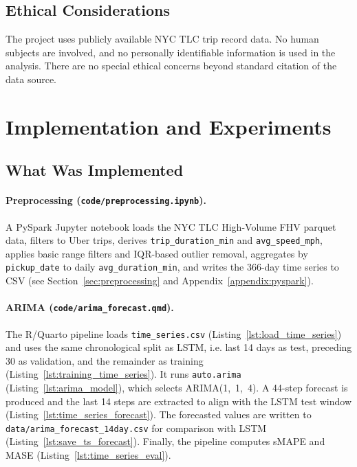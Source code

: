 \documentclass[12pt, a4paper]{article}
\begin{document}
\subsection{Ethical Considerations}

The project uses publicly available NYC TLC trip record data. No human subjects are involved, and no personally identifiable information is used in the analysis. There are no special ethical concerns beyond standard citation of the data source.

\section{Implementation and Experiments}\label{sec:implementation}

\subsection{What Was Implemented}

\paragraph{Preprocessing (\texttt{code/preprocessing.ipynb}).}\mbox{} A PySpark Jupyter notebook loads the NYC TLC High-Volume FHV parquet data, filters to Uber trips, derives \texttt{trip\_duration\_\allowbreak min} and \texttt{avg\_speed\_mph}, applies basic range filters and IQR-based outlier removal, aggregates by \texttt{pickup\_date} to daily \texttt{avg\_duration\_min}, and writes the 366-day time series to CSV (see Section~\ref{sec:preprocessing} and Appendix~\ref{appendix:pyspark}).

\paragraph{ARIMA (\texttt{code/arima\_forecast.qmd}).}\mbox{} The R/Quarto pipeline loads \texttt{time\_series.csv} (Listing~\ref{lst:load_time_series}) and uses the same chronological split as LSTM, i.e. last 14 days as test, preceding 30 as validation, and the remainder as training (Listing~\ref{lst:training_time_series}). It runs \texttt{auto.arima} (Listing~\ref{lst:arima_model}), which selects ARIMA(1,~1,~4). A 44-step forecast is produced and the last 14 steps are extracted to align with the LSTM test window (Listing~\ref{lst:time_series_forecast}). The forecasted values are written to \texttt{data/arima\_forecast\_\allowbreak 14day.csv} for comparison with LSTM (Listing~\ref{lst:save_ts_forecast}). Finally, the pipeline computes sMAPE and MASE (Listing~\ref{lst:time_series_eval}).
\end{document}
